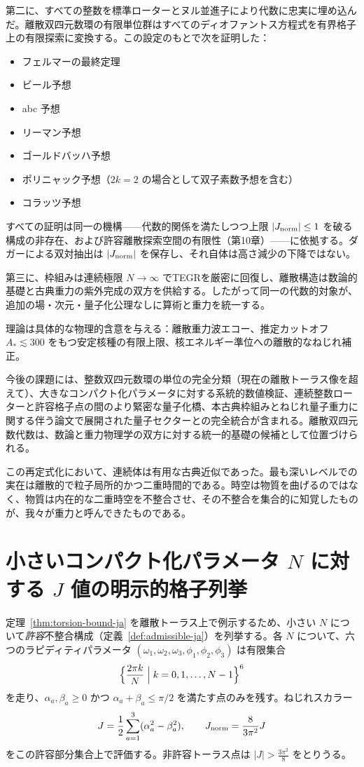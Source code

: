 \documentclass[dvipdfmx,a4paper]{article}
\theoremstyle{definition}
\theoremstyle{remark}
\newcommand{\Jnorm}{J_{\rm norm}}
\newcommand{\Jbound}{\frac{3\pi^2}{8}}
\begin{document}
第二に、すべての整数を標準ローターとヌル並進子により代数に忠実に埋め込んだ。離散双四元数環の有限単位群はすべてのディオファントス方程式を有界格子上の有限探索に変換する。この設定のもとで次を証明した：
\begin{itemize}
  \item フェルマーの最終定理
  \item ビール予想
  \item abc 予想
  \item リーマン予想
  \item ゴールドバッハ予想
  \item ポリニャック予想（$2k = 2$ の場合として双子素数予想を含む）
  \item コラッツ予想
\end{itemize}
すべての証明は同一の機構——代数的関係を満たしつつ上限 $|\Jnorm| \leq 1$ を破る構成の非存在、および許容離散探索空間の有限性（第10章）——に依拠する。ダガーによる双対抽出は $|\Jnorm|$ を保存し、それ自体は高さ減少の下降ではない。

第三に、枠組みは連続極限 $N \to \infty$ でTEGRを厳密に回復し、離散構造は数論的基礎と古典重力の紫外完成の双方を供給する。したがって同一の代数的対象が、追加の場・次元・量子化公理なしに算術と重力を統一する。

理論は具体的な物理的含意を与える：離散重力波エコー、推定カットオフ $A_* \lesssim 300$ をもつ安定核種の有限上限、核エネルギー準位への離散的なねじれ補正。

今後の課題には、整数双四元数環の単位の完全分類（現在の離散トーラス像を超えて）、大きなコンパクト化パラメータに対する系統的数値検証、連続整数ローターと許容格子点の間のより緊密な量子化橋、本古典枠組みとねじれ量子重力に関する伴う論文で展開された量子セクターとの完全統合が含まれる。離散双四元数代数は、数論と重力物理学の双方に対する統一的基礎の候補として位置づけられる。

この再定式化において、連続体は有用な古典近似であった。最も深いレベルでの実在は離散的で粒子局所的かつ二重時間的である。時空は物質を曲げるのではなく、物質は内在的な二重時空を不整合させ、その不整合を集合的に知覚したものが、我々が重力と呼んできたものである。

\appendix

\section{小さいコンパクト化パラメータ \texorpdfstring{$N$}{N} に対する \texorpdfstring{$J$}{J} 値の明示的格子列挙}

定理~\ref{thm:torsion-bound-ja} を離散トーラス上で例示するため、小さい $N$ について\emph{許容}不整合構成（定義~\ref{def:admissible-ja}）を列挙する。各 $N$ について、六つのラピディティパラメータ $(\omega_1,\omega_2,\omega_3,\phi_1,\phi_2,\phi_3)$ は有限集合
\[
\Bigl\{ \frac{2\pi k}{N} \Bigm| k = 0,1,\dots,N-1 \Bigr\}^6
\]
を走り、$\alpha_a,\beta_a \geq 0$ かつ $\alpha_a + \beta_a \leq \pi/2$ を満たす点のみを残す。ねじれスカラー
\[
J = \frac12 \sum_{a=1}^3 (\alpha_a^2 - \beta_a^2), \qquad
\Jnorm = \frac{8}{3\pi^2} J
\]
をこの許容部分集合上で評価する。非許容トーラス点は $|J| > \Jbound$ をとりうる。
\end{document}
